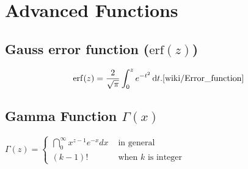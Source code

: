 \chapter{Advanced Functions}


\section{Gauss error function ($\text{erf}(z)$)}

\[
    {\displaystyle \operatorname {erf} (z)={\dfrac {2}{\sqrt {\pi }}}\int _{0}^{z}e^{-t^{2}}\,\mathrm {d} t.}
    \hfill \text{\cite{wiki/Error_function}}
\]



\section{Gamma Function $\Gamma(x)$}

$
    \Gamma(z) = \begin{cases}
        \dint_{0}^{\infty} x^{z-1} e^{-x} dx & \text{ in general} \\
        (k-1)! & \text{ when $k$ is integer}
    \end{cases}
$
\hfill \cite{statistics/book/Statistics-for-Data-Scientists/Maurits-Kaptein}

















